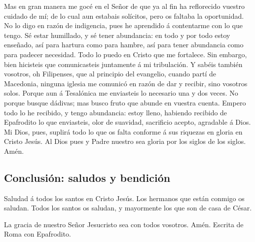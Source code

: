  Mas en gran manera me gocé en el Señor de que ya al fin ha
reflorecido vuestro cuidado de mí; de lo cual aun estabais solícitos,
pero os faltaba la oportunidad.  No lo digo en razón de
indigencia, pues he aprendido á contentarme con lo que tengo.
 Sé estar humillado, y sé tener abundancia: en todo y por
todo estoy enseñado, así para hartura como para hambre, así para tener
abundancia como para padecer necesidad.  Todo lo puedo en
Cristo que me fortalece.  Sin embargo, bien hicisteis que
comunicasteis juntamente á mi tribulación.  Y sabéis
también vosotros, oh Filipenses, que al principio del evangelio, cuando
partí de Macedonia, ninguna iglesia me comunicó en razón de dar y
recibir, sino vosotros solos.  Porque aun á Tesalónica me
enviasteis lo necesario una y dos veces.  No porque busque
dádivas; mas busco fruto que abunde en vuestra cuenta. 
Empero todo lo he recibido, y tengo abundancia: estoy lleno, habiendo
recibido de Epafrodito lo que enviasteis, olor de suavidad, sacrificio
acepto, agradable á Dios.  Mi Dios, pues, suplirá todo lo
que os falta conforme á sus riquezas en gloria en Cristo Jesús.
 Al Dios pues y Padre nuestro sea gloria por los siglos de
los siglos. Amén.

\hypertarget{conclusiuxf3n-saludos-y-bendiciuxf3n}{%
\subsection{Conclusión: saludos y
bendición}\label{conclusiuxf3n-saludos-y-bendiciuxf3n}}

 Saludad á todos los santos en Cristo Jesús. Los hermanos
que están conmigo os saludan.  Todos los santos os saludan,
y mayormente los que son de casa de César.

 La gracia de nuestro Señor Jesucristo sea con todos
vosotros. Amén. Escrita de Roma con Epafrodito.
